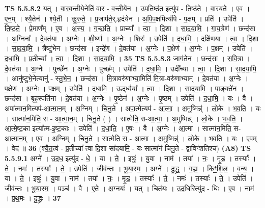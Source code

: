\documentclass[17pt]{extarticle}
\begin{document}
                  \newline
                                \textbf{ TS 5.5.8.2} \newline
                  यत् । वा॒र॒व॒न्तीये॒नेति॑ वार - व॒न्तीये॑न । उ॒प॒तिष्ठ॑त॒ इत्यु॑प - तिष्ठ॑ते । वा॒रय॑ते । ए॒व । ए॒न॒म् । श्यै॒तेन॑ । श्ये॒ती । कु॒रु॒ते॒ । प्र॒जाप॑ते॒र्.हृद॑येन । अ॒पि॒प॒क्षमित्य॑पि - प॒क्षम् । प्रति॑ । उपेति॑ । ति॒ष्ठ॒ते॒ । प्रे॒माण᳚म् । ए॒व । अ॒स्य॒ । ग॒च्छ॒ति॒ । प्राच्या᳚ । त्वा॒ । दि॒शा । सा॒द॒या॒मि॒ । गा॒य॒त्रेण॑ । छन्द॑सा । अ॒ग्निना᳚ । दे॒वत॑या । अ॒ग्नेः । शी॒र्ष्णा । अ॒ग्नेः । शिरः॑ । उपेति॑ । द॒धा॒मि॒ । दक्षि॑णया । त्वा॒ । दि॒शा । सा॒द॒या॒मि॒ । त्रैष्टु॑भेन । छन्द॑सा । इन्द्रे॑ण । दे॒वत॑या । अ॒ग्नेः । प॒क्षेण॑ । अ॒ग्नेः । प॒क्षम् । उपेति॑ । द॒धा॒मि॒ । प्र॒तीच्या᳚ । त्वा॒ । दि॒शा । सा॒द॒या॒मि॒ । \textbf{  35} \newline
                  \newline
                                \textbf{ TS 5.5.8.3} \newline
                  जाग॑तेन । छन्द॑सा । स॒वि॒त्रा । दे॒वत॑या । अ॒ग्नेः । पुच्छे॑न । अ॒ग्नेः । पुच्छ᳚म् । उपेति॑ । द॒धा॒मि॒ । उदी᳚च्या । त्वा॒ । दि॒शा । सा॒द॒या॒मि॒ । आनु॑ष्टुभे॒नेत्यानु॑ - स्तु॒भे॒न॒ । छन्द॑सा । मि॒त्रावरु॑णाभ्या॒मिति॑ मि॒त्रा-वरु॑णाभ्याम् । दे॒वत॑या । अ॒ग्नेः । प॒क्षेण॑ । अ॒ग्नेः । प॒क्षम् । उपेति॑ । द॒धा॒मि॒ । ऊ॒द्‌र्ध्वया᳚ । त्वा॒ । दि॒शा । सा॒द॒या॒मि॒ । पाङ्क्ते॑न । छन्द॑सा । बृह॒स्पति॑ना । दे॒वत॑या । अ॒ग्नेः । पृ॒ष्ठेन॑ । अ॒ग्नेः । पृ॒ष्ठम् । उपेति॑ । द॒धा॒मि॒ । यः । वै । अपा᳚त्मान॒मित्यप॑-आ॒त्मा॒न॒म् । अ॒ग्निम् । चि॒नु॒ते । अपा॒त्मेत्यप॑ - आ॒त्मा॒ । अ॒मुष्मिन्न्॑ । लो॒के । भ॒व॒ति॒ । यः । सात्मा॑न॒मिति॒ स - आ॒त्मा॒न॒म् । चि॒नु॒ते ( ) । सात्मेति॒ स-आ॒त्मा॒ । अ॒मुष्मिन्न्॑ । लो॒के । भ॒व॒ति॒ । आ॒त्मे॒ष्ट॒का इत्या᳚त्म-इ॒ष्ट॒काः । उपेति॑ । द॒धा॒ति॒ । ए॒षः । वै । अ॒ग्नेः । आ॒त्मा । सात्मा॑न॒मिति॒ स-आ॒त्मा॒न॒म् । ए॒व । अ॒ग्निम् । चि॒नु॒ते॒ । सात्मेति॒ स - आ॒त्मा॒ । अ॒मुष्मिन्न्॑ । लो॒के । भ॒व॒ति॒ । यः । ए॒वम् । वेद॑ ॥ \textbf{  36 } \newline
                  \newline
                      (श्यै॒त॒त्वं - प्र॒तीच्या᳚ त्वा दि॒शा सा॑दयामि॒ - यः सात्मा॑नं चिनु॒ते - द्वाविꣳ॑शतिश्च)  \textbf{(A8)} \newline \newline
                                \textbf{ TS 5.5.9.1} \newline
                  अग्ने᳚ । उ॒द॒ध॒ इत्यु॑द - धे॒ । या । ते॒ । इषुः॑ । यु॒वा । नाम॑ । तया᳚ । नः॒ । मृ॒ड॒ । तस्याः᳚ । ते॒ । नमः॑ । तस्याः᳚ । ते॒ । उपेति॑ । जीव॑न्तः । भू॒या॒स्म॒ । अग्ने᳚ । दु॒द्ध्र॒ । ग॒ह्य॒ । किꣳ॒॒शि॒ल॒ । व॒न्य॒ । या । ते॒ । इषुः॑ । यु॒वा । नाम॑ । तया᳚ । नः॒ । मृ॒ड॒ । तस्याः᳚ । ते॒ । नमः॑ । तस्याः᳚ । ते॒ । उपेति॑ । जीव॑न्तः । भू॒या॒स्म॒ । पञ्च॑ । वै । ए॒ते । अ॒ग्नयः॑ । यत् । चित॑यः । उ॒द॒धिरित्यु॑द - धिः । ए॒व । नाम॑ । प्र॒थ॒मः । दु॒द्ध्रः । \textbf{  37} \newline
\end{document}
